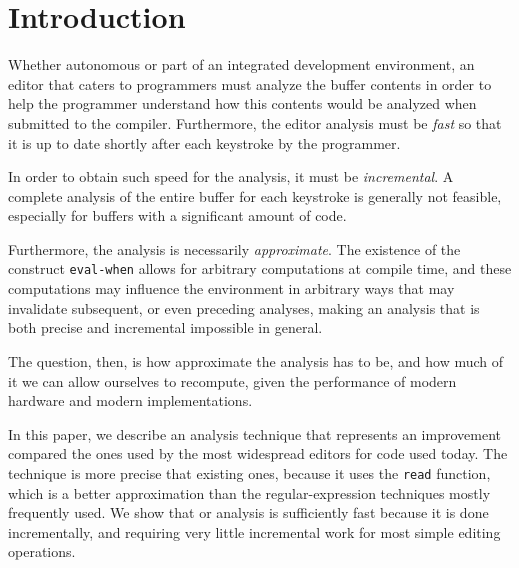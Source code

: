 \section{Introduction}

Whether autonomous or part of an integrated development environment,
an editor that caters to \commonlisp{} programmers must analyze the
buffer contents in order to help the programmer understand how this
contents would be analyzed when submitted to the \commonlisp{}
compiler.  Furthermore, the editor analysis must be \emph{fast} so
that it is up to date shortly after each keystroke by the programmer.

In order to obtain such speed for the analysis, it must be
\emph{incremental}.  A complete analysis of the entire buffer for each
keystroke is generally not feasible, especially for buffers with a
significant amount of code.

Furthermore, the analysis is necessarily \emph{approximate}.  The
existence of the construct \texttt{eval-when} allows for arbitrary
computations at compile time, and these computations may influence the
environment in arbitrary ways that may invalidate subsequent, or even
preceding analyses, making an analysis that is both precise and
incremental impossible in general.

The question, then, is how approximate the analysis has to be, and how
much of it we can allow ourselves to recompute, given the performance
of modern hardware and modern \commonlisp{} implementations.

In this paper, we describe an analysis technique that represents an
improvement compared the ones used by the most widespread editors for
\commonlisp{} code used today.  The technique is more precise that
existing ones, because it uses the \commonlisp{} \texttt{read}
function, which is a better approximation than the regular-expression
techniques mostly frequently used.  We show that or analysis is
sufficiently fast because it is done incrementally, and requiring very
little incremental work for most simple editing operations.

